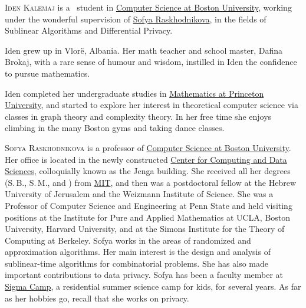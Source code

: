\documentclass{toc}
\begin{document}
%
%
%
%
%
%
%
%
%
%
%
%
%
%
%
%
%
%
%
%
\begin{tocaboutauthors}
\begin{tocabout}[kalemaj]  %
  \textsc{Iden Kalemaj} is a \phd\ student in \href{https://www.bu.edu/cs/}{Computer Science at Boston University}, working under the wonderful supervision of \href{https://cs-people.bu.edu/sofya/}{Sofya Raskhodnikova}, in the fields of Sublinear Algorithms and Differential Privacy. 

\noindent
  Iden grew up in Vlor{\"e}, Albania.
  Her math teacher and school master, Dafina Brokaj, with a rare sense of humour and wisdom, instilled in Iden the confidence to pursue mathematics.

\noindent
  Iden completed her undergraduate studies in \href{https://www.math.princeton.edu/}{Mathematics at Princeton University}, and started to explore her interest in theoretical computer science via classes in graph theory and complexity theory. In her free time she enjoys climbing in the many Boston gyms and taking dance classes.
\end{tocabout}


%
\begin{tocabout}[raskhodnikova]   %
\textsc{Sofya Raskhodnikova} is a professor of \href{https://www.bu.edu/cs/}{Computer Science at Boston University}. Her office is located in the newly constructed \href{https://www.bu.edu/cds-faculty/explore/bu-center-for-computing-data-sciences/}{Center for Computing and Data Sciences}, colloquially known as the Jenga building. She received all her degrees (S.\,B., S.\,M., and \phd) from \href{https://web.mit.edu/}{MIT}, and then was a postdoctoral fellow at the Hebrew University of Jerusalem and the Weizmann Institute of Science. She was a Professor of Computer Science and Engineering at Penn State and held visiting positions at the Institute for Pure and Applied Mathematics at UCLA,
Boston University, Harvard University, and at the Simons Institute for the Theory of Computing at Berkeley. Sofya works in the areas of randomized and approximation
algorithms. Her main interest is the design and analysis of sublinear-time algorithms for combinatorial problems. She has also made important contributions to data privacy. Sofya has been a faculty member at \href{https://sigmacamp.org/}{Sigma Camp}, a residential summer science camp for kids, for several years. 
As far as her hobbies go, recall that she works on privacy.
\end{tocabout}


\end{tocaboutauthors}
\end{document}
